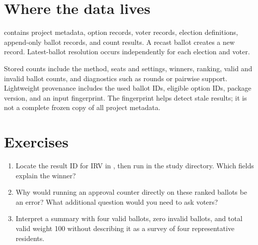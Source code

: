 \section{Where the data lives}
 contains project metadata, option records, voter records, election definitions, append-only ballot records, and count results. A recast ballot creates a new record. Latest-ballot resolution occurs independently for each election and voter.

Stored counts include the method, seats and settings, winners, ranking, valid and invalid ballot counts, and diagnostics such as rounds or pairwise support. Lightweight provenance includes the used ballot IDs, eligible option IDs, package version, and an input fingerprint. The fingerprint helps detect stale results; it is not a complete frozen copy of all project metadata.

\section{Exercises}
\begin{enumerate}
\item Locate the result ID for IRV in , then run  in the study directory. Which fields explain the winner?
\item Why would running an approval counter directly on these ranked ballots be an error? What additional question would you need to ask voters?
\item Interpret a summary with four valid ballots, zero invalid ballots, and total valid weight 100 without describing it as a survey of four representative residents.
\end{enumerate}
